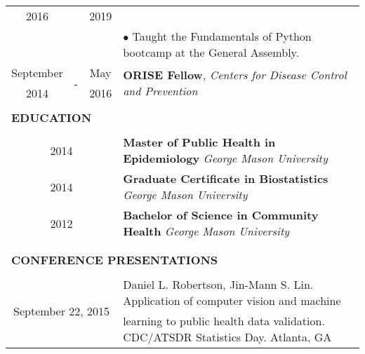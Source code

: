 \documentclass[10pt]{article}
\begin{document}
\begin{table}[ht]
\begin{tabular}{@{\hspace{0mm}}c@{\hspace{1mm}}c@{\hspace{3mm}}cl}
            2016 & & 2019 &\\
            & & & $\bullet$ Taught the Fundamentals of Python bootcamp at the General Assembly.\\
            September & \multirow{2}{*}{-} & May & \multirow{2}{*}{\textbf{ORISE Fellow}, \textit{Centers for Disease Control and Prevention}}\\
            2014 & & 2016 &\\
            \hline\\[-3mm]
            \multicolumn{4}{l}{\large{\textbf{EDUCATION}}}\\
            \hline\\[-2mm]
            \multicolumn{3}{c}{2014} & \textbf{Master of Public Health in Epidemiology} \textit{George Mason University}\\[1mm]
            \multicolumn{3}{c}{2014} & \textbf{Graduate Certificate in Biostatistics} \textit{George Mason University}\\[1mm]
            \multicolumn{3}{c}{2012} & \textbf{Bachelor of Science in Community Health} \textit{George Mason University}\\\\[-2mm]
            \hline\\[-3mm]
            \multicolumn{4}{l}{\large{\textbf{CONFERENCE PRESENTATIONS}}}\\
            \hline\\[-2mm]
            \multicolumn{3}{c}{\multirow{2}{*}{September 22, 2015}} & Daniel L. Robertson, Jin-Mann S. Lin. Application of computer vision and machine\\
            & & & learning to public health data validation. CDC/ATSDR Statistics Day. Atlanta, GA\\
        \end{tabular}
    \end{table}
\end{document}
